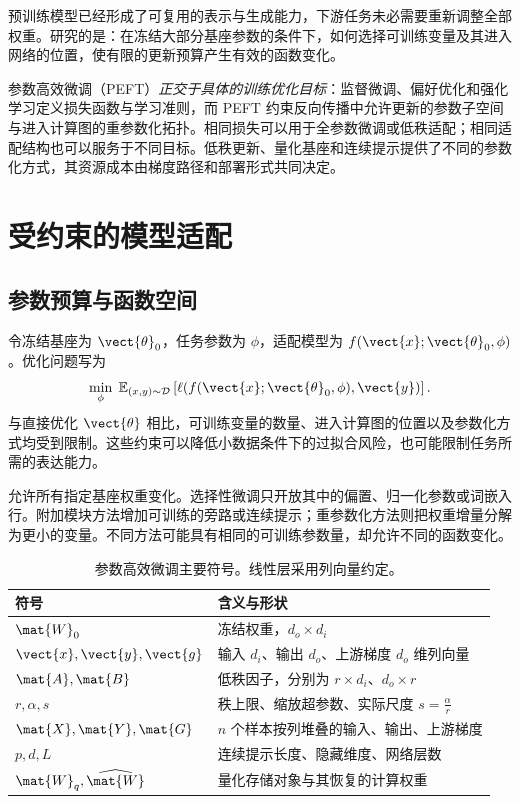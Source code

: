 \documentclass[../textbook.tex]{subfiles}
\begin{document}
\fi
{}

预训练模型已经形成了可复用的表示与生成能力，下游任务未必需要重新调整全部权重。研究的是：在冻结大部分基座参数的条件下，如何选择可训练变量及其进入网络的位置，使有限的更新预算产生有效的函数变化。

参数高效微调（PEFT）\emph{正交于具体的训练优化目标}：监督微调、偏好优化和强化学习定义损失函数与学习准则，而 PEFT 约束反向传播中允许更新的参数子空间与进入计算图的重参数化拓扑。相同损失可以用于全参数微调或低秩适配；相同适配结构也可以服务于不同目标。低秩更新、量化基座和连续提示提供了不同的参数化方式，其资源成本由梯度路径和部署形式共同决定。

\section{受约束的模型适配}

\subsection{参数预算与函数空间}
令冻结基座为 $\vect{\theta}_0$，任务参数为 $\phi$，适配模型为 $f(\vect{x};\vect{\theta}_0,\phi)$。优化问题写为
\begin{equation}
\min_\phi\;\mathbb E_{(x,y)\sim\mathcal D}
\left[\ell(f(\vect{x};\vect{\theta}_0,\phi),\vect{y})\right].
\end{equation}
与直接优化 $\vect{\theta}$ 相比，可训练变量的数量、进入计算图的位置以及参数化方式均受到限制。这些约束可以降低小数据条件下的过拟合风险，也可能限制任务所需的表达能力。

允许所有指定基座权重变化。选择性微调只开放其中的偏置、归一化参数或词嵌入行。附加模块方法增加可训练的旁路或连续提示；重参数化方法则把权重增量分解为更小的变量。不同方法可能具有相同的可训练参数量，却允许不同的函数变化。

\begin{table}[htbp]
\centering
\caption[参数高效微调主要符号]{参数高效微调主要符号。线性层采用列向量约定。}\label{tab:peft-symbols}
\begin{tabular}{ll}
\toprule
符号 & 含义与形状\\
\midrule
$\mat{W}_0$ & 冻结权重，$d_o\times d_i$\\
$\vect{x},\vect{y},\vect{g}$ & 输入 $d_i$、输出 $d_o$、上游梯度 $d_o$ 维列向量\\
$\mat{A},\mat{B}$ & 低秩因子，分别为 $r\times d_i$、$d_o\times r$\\
$r,\alpha,s$ & 秩上限、缩放超参数、实际尺度 $s=\frac{\alpha}{r}$\\
$\mat{X},\mat{Y},\mat{G}$ & $n$ 个样本按列堆叠的输入、输出、上游梯度\\
$p,d,L$ & 连续提示长度、隐藏维度、网络层数\\
$\mat{W}_q,\widehat{\mat{W}}$ & 量化存储对象与其恢复的计算权重\\
\bottomrule
\end{tabular}
\end{table}
\end{document}
